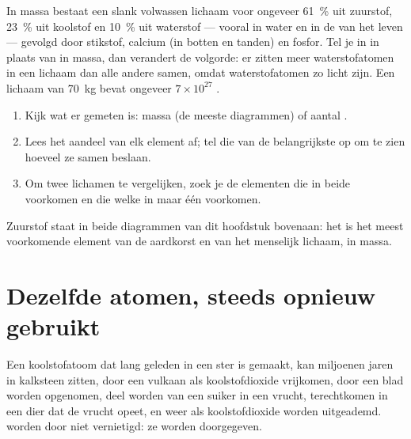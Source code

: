 \begin{proposition}\label{prop:g9:elements-universe-earth:body}
In massa bestaat een slank volwassen lichaam voor ongeveer
\qty{61}{\percent} uit zuurstof, \qty{23}{\percent} uit koolstof en
\qty{10}{\percent} uit waterstof --- vooral in water en in de 
van het leven --- gevolgd door stikstof, calcium (in botten en tanden)
en fosfor. Tel je in  in plaats van in massa, dan verandert de
volgorde: er zitten meer waterstofatomen in een lichaam dan alle andere
 samen, omdat waterstofatomen zo licht zijn. Een lichaam van
\qty{70}{kg} bevat ongeveer $7 \times 10^{27}$ .
\end{proposition}

\begin{method}\label{met:g9:elements-universe-earth:read}
\begin{enumerate}
  \item Kijk wat er gemeten is: massa (de meeste diagrammen) of aantal
        .
  \item Lees het aandeel van elk element af; tel die van de belangrijkste
        op om te zien hoeveel ze samen beslaan.
  \item Om twee lichamen te vergelijken, zoek je de elementen die in
        beide voorkomen en die welke in maar één voorkomen.
\end{enumerate}
Zuurstof staat in beide diagrammen van dit hoofdstuk bovenaan: het is
het meest voorkomende element van de aardkorst en van het menselijk
lichaam, in massa.
\end{method}

\section{Dezelfde atomen, steeds opnieuw gebruikt}

\begin{example}\label{ex:g9:elements-universe-earth:journey}
Een koolstofatoom dat lang geleden in een ster is gemaakt, kan miljoenen
jaren in kalksteen zitten, door een vulkaan als koolstofdioxide
vrijkomen, door een blad worden opgenomen, deel worden van een suiker in
een vrucht, terechtkomen in een dier dat de vrucht opeet, en weer als
koolstofdioxide worden uitgeademd.  worden door  niet vernietigd: ze worden doorgegeven.
\end{example}

